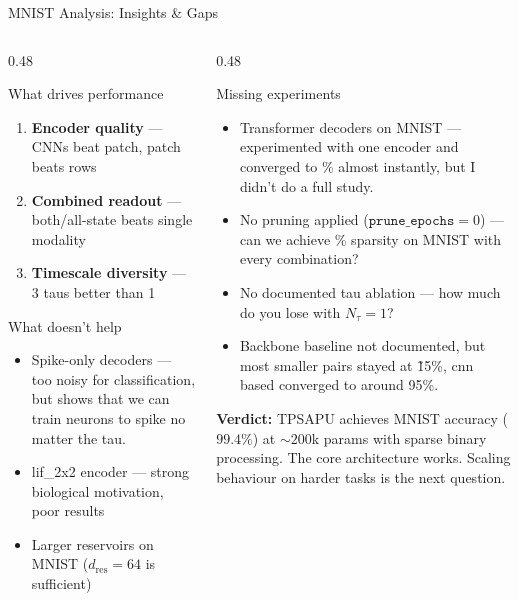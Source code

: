 \documentclass[aspectratio=169,11pt]{beamer}
\begin{document}
\begin{frame}[shrink=5]{MNIST Analysis: Insights \& Gaps}
\begin{columns}[T]
\begin{column}{0.48\textwidth}
  \begin{block}{What drives performance}
    \begin{enumerate}\footnotesize
      \item \textbf{Encoder quality} — CNNs beat patch, patch beats rows
      \item \textbf{Combined readout} — both/all-state beats single modality
      \item \textbf{Timescale diversity} — 3 taus better than 1
    \end{enumerate}
  \end{block}
  \vspace{0.3em}
  \begin{alertblock}{What doesn't help}
    \begin{itemize}\footnotesize
      \item Spike-only decoders — too noisy for classification, but shows that we can train neurons to spike no matter the tau.
      \item lif\_2x2 encoder — strong biological motivation, poor results
      \item Larger reservoirs on MNIST ($d_\text{res}=64$ is sufficient)
    \end{itemize}
  \end{alertblock}
\end{column}
\begin{column}{0.48\textwidth}
  \begin{alertblock}{Missing experiments}
    \begin{itemize}\footnotesize
      \item Transformer decoders on MNIST — experimented with one encoder and converged to \% almost instantly, but I didn't do a full study.
      \item No pruning applied ($\texttt{prune\_epochs}=0$) — can we achieve \% sparsity on MNIST with every combination?
      \item No documented tau ablation — how much do you lose with $N_\tau=1$?
      \item Backbone baseline not documented, but most smaller pairs stayed at \~15\%, cnn based converged to around 95\%.
    \end{itemize}
  \end{alertblock}
  \vspace{0.3em}
  \begin{tcolorbox}[mybox]
    \scriptsize
    \textbf{Verdict:} TPSAPU achieves MNIST accuracy ($99.4\%$) at $\sim200$k params with sparse binary processing.
    The core architecture works.
    Scaling behaviour on harder tasks is the next question.
  \end{tcolorbox}
\end{column}
\end{columns}
\end{frame}
\end{document}
